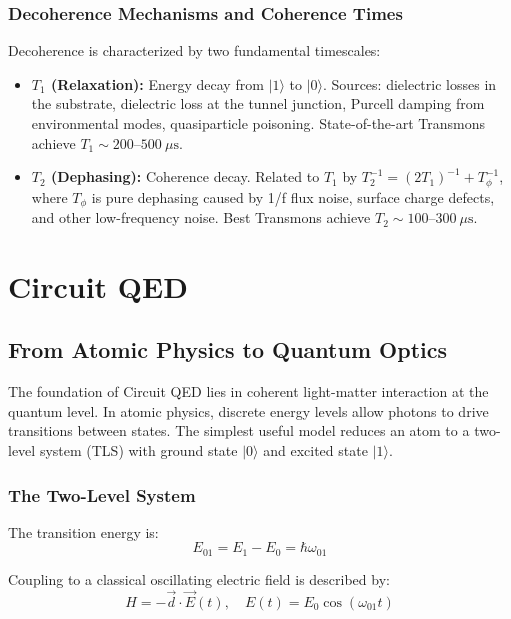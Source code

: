 \documentclass{article}
\begin{document}
\subsubsection*{Decoherence Mechanisms and Coherence Times}

Decoherence is characterized by two fundamental timescales:

\begin{itemize}
    \item \textbf{$T_1$ (Relaxation):} Energy decay from $|1\rangle$ to $|0\rangle$. Sources: dielectric losses in the substrate, dielectric loss at the tunnel junction, Purcell damping from environmental modes, quasiparticle poisoning. State-of-the-art Transmons achieve $T_1 \sim 200\text{--}500~\mu\text{s}$.
    
    \item \textbf{$T_2$ (Dephasing):} Coherence decay. Related to $T_1$ by $T_2^{-1} = (2T_1)^{-1} + T_\phi^{-1}$, where $T_\phi$ is pure dephasing caused by 1/f flux noise, surface charge defects, and other low-frequency noise. Best Transmons achieve $T_2 \sim 100\text{--}300~\mu\text{s}$.
\end{itemize}


\newpage
\section{Circuit QED}

\subsection{From Atomic Physics to Quantum Optics}

The foundation of Circuit QED lies in coherent light-matter interaction at the quantum level. In atomic physics, discrete energy levels allow photons to drive transitions between states. The simplest useful model reduces an atom to a two-level system (TLS) with ground state $|0\rangle$ and excited state $|1\rangle$.

\subsubsection*{The Two-Level System}

The transition energy is:
$$E_{01} = E_1 - E_0 = \hbar\omega_{01}$$

Coupling to a classical oscillating electric field is described by:
$$H = -\vec{d} \cdot \vec{E}(t), \quad E(t) = E_0 \cos(\omega_{01} t)$$
\end{document}

